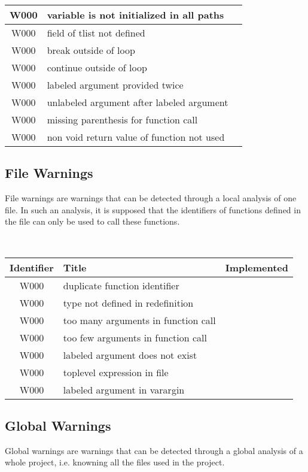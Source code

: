 \begin{tabular}{|c|p{8cm}|c|}
W000 & variable is not initialized in all paths &  \\ \hline
W000 & field of tlist not defined &  \\ \hline
W000 & break outside of loop &  \\ \hline
W000 & continue outside of loop &  \\ \hline
W000 & labeled argument provided twice &  \\ \hline
W000 & unlabeled argument after labeled argument &  \\ \hline
W000 & missing parenthesis for function call &  \\ \hline
W000 & non void return value of function not used &  \\ \hline
\end{tabular}

\subsection{File Warnings}

File warnings are warnings that can be detected through a local
analysis of one file. In such an analysis, it is supposed that the
identifiers of functions defined in the file can only be used to call
these functions.

\noindent\\\begin{tabular}{|c|p{8cm}|c|} \hline
Identifier & Title & Implemented      \\ \hline
W000 & duplicate function identifier &  \\ \hline
W000 & type not defined in redefinition &  \\ \hline
W000 & too many arguments in function call &  \\ \hline
W000 & too few arguments in function call  &  \\ \hline
W000 & labeled argument does not exist &  \\ \hline
W000 & toplevel expression in file &  \\ \hline
W000 & labeled argument in varargin &  \\ \hline
\end{tabular}

\subsection{Global Warnings}

Global warnings are warnings that can be detected through a global
analysis of a whole project, i.e. knowning all the files used in the
project.

